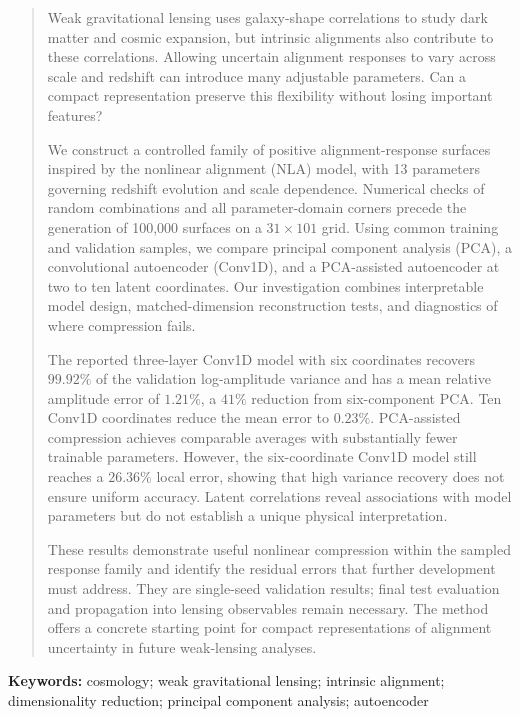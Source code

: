 \documentclass[11pt,a4paper]{article}
\begin{document}
\begin{abstract}
Weak gravitational lensing uses galaxy-shape correlations to study dark
matter and cosmic expansion, but intrinsic alignments also contribute to
these correlations. Allowing uncertain alignment responses to vary across
scale and redshift can introduce many adjustable parameters. Can a compact
representation preserve this flexibility without losing important features?

We construct a controlled family of positive alignment-response surfaces
inspired by the nonlinear alignment (NLA) model, with 13 parameters governing redshift evolution and scale
dependence. Numerical checks of random combinations and all parameter-domain
corners precede the generation of 100,000 surfaces on a $31\times101$ grid.
Using common training and validation samples, we compare principal component
analysis (PCA), a convolutional autoencoder (Conv1D), and a PCA-assisted
autoencoder at two to ten latent coordinates. Our investigation combines
interpretable model design, matched-dimension reconstruction tests, and
diagnostics of where compression fails.

The reported three-layer Conv1D model with six coordinates recovers
$99.92\%$ of the validation log-amplitude variance and has a mean relative
amplitude error of $1.21\%$, a $41\%$ reduction from six-component PCA.
Ten Conv1D coordinates reduce the mean error to $0.23\%$. PCA-assisted
compression achieves comparable averages with substantially fewer trainable
parameters. However, the six-coordinate Conv1D model still reaches a
$26.36\%$ local error, showing that high variance recovery does not ensure
uniform accuracy. Latent correlations reveal associations with model
parameters but do not establish a unique physical interpretation.

These results demonstrate useful nonlinear compression within the sampled
response family and identify the residual errors that further development
must address. They are single-seed validation results; final test evaluation
and propagation into lensing observables remain necessary. The method offers
a concrete starting point for compact representations of alignment
uncertainty in future weak-lensing analyses.
\end{abstract}

\noindent\textbf{Keywords:} cosmology; weak gravitational lensing; intrinsic
alignment; dimensionality reduction; principal component analysis;
autoencoder

\clearpage
\begingroup
\setlength{\parskip}{0pt}
\tableofcontents
\endgroup
\clearpage








\clearpage


\clearpage
{}
{}
\begin{thebibliography}{99}
\small
\setlength{\bibsep}{0.6em}

\end{thebibliography}
\end{document}
